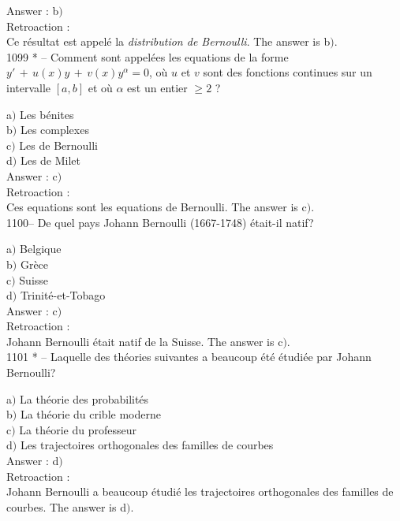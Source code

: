 ﻿\documentclass[letterpaper, 12pt]{article}
\begin{document}
Answer : b$)$\\

Retroaction : \\
Ce r\'esultat est appel\'e la {\sl distribution de Bernoulli}.
The answer is b$)$.\\

1099 * -- Comment sont appel\'ees les equations de la forme
$y'\,+\,u(x)y\,+\,v(x)y^{\alpha}=0$, o\`u $u$ et $v$ sont des
fonctions continues sur un intervalle $[a,b]$ et o\`u $\alpha$ est
un entier $\ge2$ ?

a$)$ Les {\slequations b\'enites} \\
b$)$ Les {\slequations complexes}  \\
c$)$ Les {\slequations de Bernoulli}  \\
d$)$ Les {\slequations de Milet}\\

Answer : c$)$\\

Retroaction : \\
Ces equations sont les equations de Bernoulli.
The answer is c$)$.\\

1100-- De quel pays Johann Bernoulli (1667-1748) \'etait-il natif?

a$)$ Belgique \\
b$)$ Gr\`ece  \\
c$)$ Suisse  \\
d$)$ Trinit\'e-et-Tobago \\

Answer : c$)$\\

Retroaction : \\
Johann Bernoulli \'etait natif de la Suisse.
The answer is c$)$.\\

1101 * -- Laquelle des th\'eories suivantes a beaucoup \'et\'e
\'etudi\'ee par Johann Bernoulli?

a$)$ La th\'eorie des probabilit\'es \\
b$)$ La th\'eorie du crible moderne  \\
c$)$ La th\'eorie du professeur  \\
d$)$ Les trajectoires orthogonales des familles de courbes\\

Answer : d$)$\\

Retroaction : \\
Johann Bernoulli a beaucoup \'etudi\'e les trajectoires orthogonales
des familles de courbes.
The answer is d$)$.\\
\end{document}
